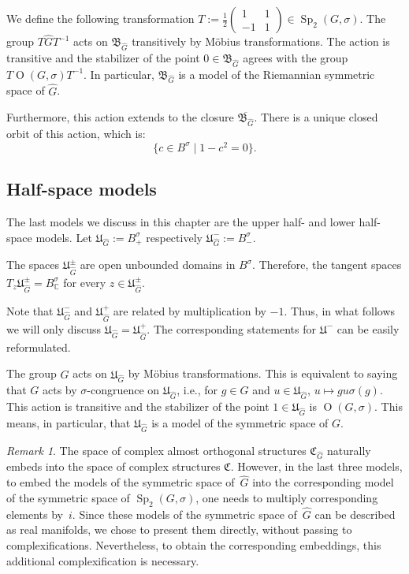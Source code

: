 \documentclass[a4paper,oneside,11pt]{amsart}
\DeclareMathOperator{\Sp}{Sp}
\DeclareMathOperator{\OO}{O}
\newcommand{\CC}{\mathbb C}
\theoremstyle{plain}
\theoremstyle{definition}
\theoremstyle{remark}
\newtheorem{rem}[teo]{Remark}
\begin{document}
We define the following transformation $T:=\frac{1}{2}\begin{pmatrix}
    1 & 1 \\
    -1 & 1
\end{pmatrix}\in \Sp_2(G,\sigma)$. The group $T\hat G T^{-1}$ acts on $\mathfrak B_{\hat G}$ transitively by M\"obius transformations. The action is transitive and the stabilizer of the point $0\in\mathfrak B_{\hat G}$ agrees with the group $T\OO(G,\sigma)T^{-1}$. In particular, $\mathfrak B_{\hat G}$ is a model of the Riemannian symmetric space of $\hat G$. 

Furthermore, this action extends to the closure $\overline{\mathfrak B_{\hat G}}$. There is a unique closed orbit of this action, which is:
$$\{c\in B^\sigma\mid 1-c^2=0\}.$$



\subsection{Half-space models}

The last models we discuss in this chapter are the upper half- and lower half-space models. Let $\mathfrak U_{\hat G}:=B^\sigma_+$ respectively $\mathfrak U_{\hat G}^-:=B^\sigma_-.$

The spaces $\mathfrak U_{\hat G}^\pm$ are open unbounded domains in $B^{\sigma}$. Therefore, the tangent spaces $T_z\mathfrak U_{\hat G}^\pm= B_\CC^{\sigma}$ for every $z\in \mathfrak U_{\hat G}^\pm$.

Note that $\mathfrak U_{\hat G}^-$ and $\mathfrak U_{\hat G}^+$ are related by multiplication by $-1$. Thus, in what follows we will only discuss $\mathfrak U_{\hat G}=\mathfrak U_{\hat G}^+$. The corresponding statements for $\mathfrak U^-$ can be easily reformulated.

The group $\hat G$ acts on $\mathfrak U_{\hat G}$ by M\"obius transformations. This is equivalent to saying that $G$ acts by $\sigma$-congruence on $\mathfrak U_{\hat G}$, i.e., for $g\in G$ and $u\in \mathfrak U_{\hat G}$, $u\mapsto g u \sigma(g)$. This action is transitive and the stabilizer of the point $1\in\mathfrak U_{\hat G}$ is $\OO(G,\sigma)$. This means, in particular, that $\mathfrak U_{\hat G}$ is a model of the symmetric space of $G$.

\begin{rem}
    The space of complex almost orthogonal structures $\mathfrak C_{\hat G}$ naturally embeds into the space of complex structures $\mathfrak C$. However, in the last three models, to embed the models of the symmetric space of~$\hat G$ into the corresponding model of the symmetric space of $\Sp_2(G,\sigma)$, one needs to multiply corresponding elements by~$i$. Since these models of the symmetric space of~$\hat G$ can be described as real manifolds, we chose to present them directly, without passing to complexifications. Nevertheless, to obtain the corresponding embeddings, this additional complexification is necessary.
\end{rem}
\end{document}
